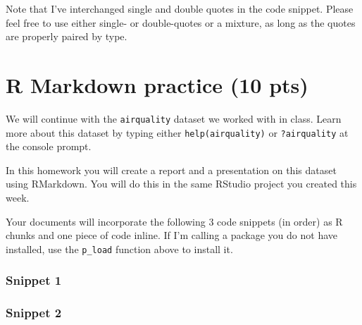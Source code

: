 \documentclass[
]{article}
\newenvironment{Shaded}{\begin{snugshade}}{\end{snugshade}}
\newcommand{\DataTypeTok}[1]{\textcolor[rgb]{0.13,0.29,0.53}{#1}}
\newcommand{\KeywordTok}[1]{\textcolor[rgb]{0.13,0.29,0.53}{\textbf{#1}}}
\newcommand{\NormalTok}[1]{#1}
\newcommand{\OperatorTok}[1]{\textcolor[rgb]{0.81,0.36,0.00}{\textbf{#1}}}
\newcommand{\StringTok}[1]{\textcolor[rgb]{0.31,0.60,0.02}{#1}}
\begin{document}
\begin{infobox}

Note that I've interchanged single and double quotes in the code
snippet. Please feel free to use either single- or double-quotes or a
mixture, as long as the quotes are properly paired by type.

\end{infobox}

\hypertarget{r-markdown-practice-10-pts}{%
\section{R Markdown practice (10
pts)}\label{r-markdown-practice-10-pts}}

We will continue with the \texttt{airquality} dataset we worked with in
class. Learn more about this dataset by typing either
\texttt{help(airquality)} or \texttt{?airquality} at the console prompt.

In this homework you will create a report and a presentation on this
dataset using RMarkdown. You will do this in the same RStudio project
you created this week.

Your documents will incorporate the following 3 code snippets (in order)
as R chunks and one piece of code inline. If I'm calling a package you
do not have installed, use the \texttt{p\_load} function above to
install it.

\hypertarget{snippet-1}{%
\subsubsection{Snippet 1}\label{snippet-1}}

\begin{Shaded}
\end{Shaded}

\hypertarget{snippet-2}{%
\subsubsection{Snippet 2}\label{snippet-2}}
\end{document}
